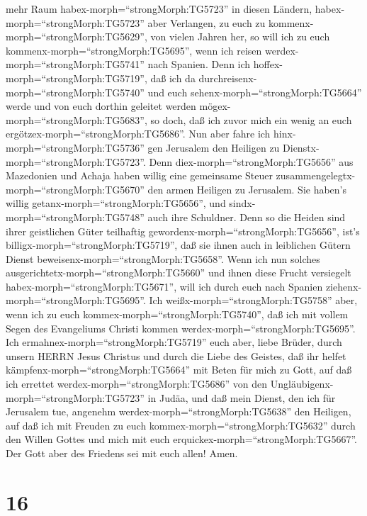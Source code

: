 mehr Raum habex-morph=``strongMorph:TG5723'' in diesen Ländern,
habex-morph=``strongMorph:TG5723'' aber Verlangen, zu euch zu
kommenx-morph=``strongMorph:TG5629'', von vielen Jahren her,
 so will ich zu euch kommenx-morph=``strongMorph:TG5695'',
wenn ich reisen werdex-morph=``strongMorph:TG5741'' nach Spanien. Denn
ich hoffex-morph=``strongMorph:TG5719'', daß ich da
durchreisenx-morph=``strongMorph:TG5740'' und euch
sehenx-morph=``strongMorph:TG5664'' werde und von euch dorthin geleitet
werden mögex-morph=``strongMorph:TG5683'', so doch, daß ich zuvor mich
ein wenig an euch ergötzex-morph=``strongMorph:TG5686''. 
Nun aber fahre ich hinx-morph=``strongMorph:TG5736'' gen Jerusalem den
Heiligen zu Dienstx-morph=``strongMorph:TG5723''.  Denn
diex-morph=``strongMorph:TG5656'' aus Mazedonien und Achaja haben willig
eine gemeinsame Steuer zusammengelegtx-morph=``strongMorph:TG5670'' den
armen Heiligen zu Jerusalem.  Sie haben's willig
getanx-morph=``strongMorph:TG5656'', und
sindx-morph=``strongMorph:TG5748'' auch ihre Schuldner. Denn so die
Heiden sind ihrer geistlichen Güter teilhaftig
gewordenx-morph=``strongMorph:TG5656'', ist's
billigx-morph=``strongMorph:TG5719'', daß sie ihnen auch in leiblichen
Gütern Dienst beweisenx-morph=``strongMorph:TG5658''.  Wenn
ich nun solches ausgerichtetx-morph=``strongMorph:TG5660'' und ihnen
diese Frucht versiegelt habex-morph=``strongMorph:TG5671'', will ich
durch euch nach Spanien ziehenx-morph=``strongMorph:TG5695''.
 Ich weißx-morph=``strongMorph:TG5758'' aber, wenn ich zu
euch kommex-morph=``strongMorph:TG5740'', daß ich mit vollem Segen des
Evangeliums Christi kommen werdex-morph=``strongMorph:TG5695''.
 Ich ermahnex-morph=``strongMorph:TG5719'' euch aber, liebe
Brüder, durch unsern HERRN Jesus Christus und durch die Liebe des
Geistes, daß ihr helfet kämpfenx-morph=``strongMorph:TG5664'' mit Beten
für mich zu Gott,  auf daß ich errettet
werdex-morph=``strongMorph:TG5686'' von den
Ungläubigenx-morph=``strongMorph:TG5723'' in Judäa, und daß mein Dienst,
den ich für Jerusalem tue, angenehm werdex-morph=``strongMorph:TG5638''
den Heiligen,  auf daß ich mit Freuden zu euch
kommex-morph=``strongMorph:TG5632'' durch den Willen Gottes und mich mit
euch erquickex-morph=``strongMorph:TG5667''.  Der Gott aber
des Friedens sei mit euch allen! Amen.

\hypertarget{section-15}{%
\section{16}\label{section-15}}

